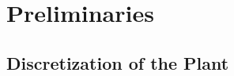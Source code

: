 \documentclass[final]{sig-alternate-05-2015}
\begin{document}





\section{Preliminaries}\label{sec:preliminaries}

\subsection{Discretization of the Plant}
\label{ssec:SandH}
\end{document}
